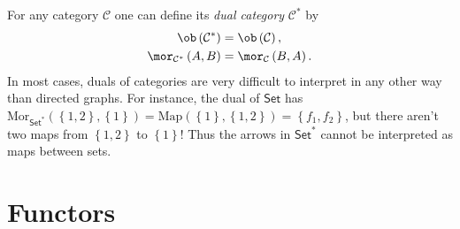 %
\begin{example}
For any category $\mathcal{C}$ one can define its \emph{dual category}
$\mathcal{C}^{\ast}$ by
\begin{align}
    \ob\left(\mathcal{C}^{\ast}\right) & =\ob\left(\mathcal{C}\right),\nonumber \\
    \mor_{\mathcal{C}^{\ast}}\left(A,B\right) & =\mor_{\mathcal{C}}\left(B,A\right).
\end{align}
In most cases, duals of categories are very difficult to interpret
in any other way than directed graphs. For instance, the dual of $\mathsf{Set}$
has $\mathrm{Mor}_{\mathsf{Set}^{\ast}}\left(\left\{ 1,2\right\} ,\left\{ 1\right\} \right)=\mathrm{Map}\left(\left\{ 1\right\} ,\left\{ 1,2\right\} \right)=\left\{ f_{1},f_{2}\right\} $,
but there aren't two maps from $\left\{ 1,2\right\} $ to $\left\{ 1\right\} $!
Thus the arrows in $\mathsf{Set}^{\ast}$ cannot be interpreted as
maps between sets.
\end{example}





\section{Functors}

